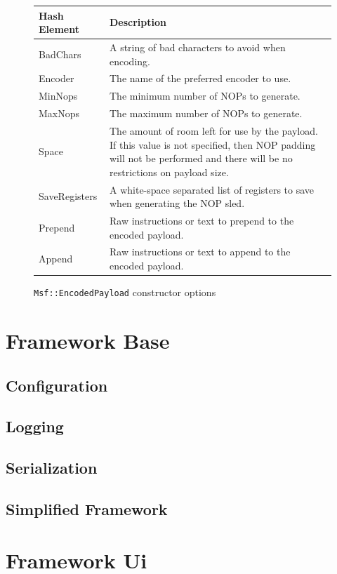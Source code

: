 \documentclass{report}
\begin{document}
\begin{figure}[h]
\begin{center}
\begin{tabular}{|l|p{3.5in}|}
\hline
\textbf{Hash Element} & \textbf{Description} \\
\hline
BadChars & A string of bad characters to avoid when encoding. \\
\hline
Encoder & The name of the preferred encoder to use. \\
\hline
MinNops & The minimum number of NOPs to generate. \\
\hline
MaxNops & The maximum number of NOPs to generate. \\
\hline
Space & The amount of room left for use by the payload.  If this value is not specified, then NOP padding will not be performed and there will be no restrictions on payload size. \\
\hline
SaveRegisters & A white-space separated list of registers to save when generating the NOP sled. \\
\hline
Prepend & Raw instructions or text to prepend to the encoded payload. \\
\hline
Append & Raw instructions or text to append to the encoded payload. \\
\hline
\end{tabular}
\caption{\texttt{Msf::EncodedPayload} constructor options}
\label{fig-table-enc-payload-options}
\end{center}
\end{figure}

    \section{Framework Base}
        \subsection{Configuration}
        \subsection{Logging}
        \subsection{Serialization}
        \subsection{Simplified Framework}
    \section{Framework Ui}
\end{document}
